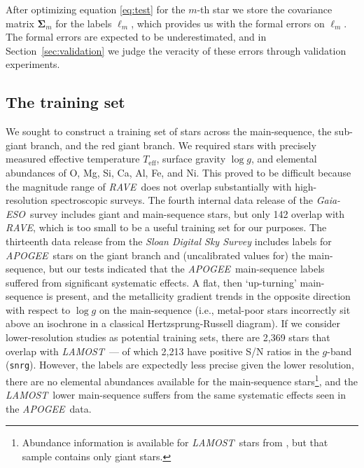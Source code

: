 \documentclass[preprint]{aastex}
\newcommand{\acronym}[1]{{\small{#1}}}
\newcommand{\project}[1]{\textsl{#1}}
\newcommand{\rave}{\project{\acronym{RAVE}}}
\newcommand{\ges}{\project{Gaia-ESO}}
\newcommand{\apogee}{\project{\acronym{APOGEE}}}
\newcommand{\lamost}{\project{\acronym{LAMOST}}}
\newcommand{\teff}{T_{\mathrm{eff}}}
\newcommand{\logg}{\log g}
\begin{document}
After optimizing equation \ref{eq:test} for the $m$-th star we store the covariance matrix 
$\bm{\Sigma}_m$ for the labels $\ell_m$, which provides us with the formal errors on $\ell_m$. 
The formal errors are expected to be underestimated, and in Section~\ref{sec:validation} 
we judge the veracity of these errors through validation experiments.



\subsection{The training set}
\label{sec:the-training-set}


We sought to construct a training set of stars across the main-sequence, the
sub-giant branch, and the red giant branch.  We required stars with precisely measured
effective temperature $\teff$, surface gravity $\logg$, and elemental abundances
of O, Mg, Si, Ca, Al, Fe, and Ni.  This proved to be difficult because the magnitude
range of \rave\ does not overlap substantially with high-resolution spectroscopic
surveys.  The fourth internal data release of the \ges\ survey includes 
giant and main-sequence stars, but only 142 overlap with \rave, which is too small to
be a useful training set for our purposes.  The thirteenth data release from the 
\project{Sloan Digital Sky Survey} \citep{sloan_dr13} includes labels for \apogee\ stars on the
giant branch and (uncalibrated values for) the main-sequence, but our tests indicated
that the \apogee\ main-sequence labels suffered from significant systematic effects.  
A flat, then `up-turning' main-sequence is present, and the metallicity gradient trends in 
the opposite direction with respect to $\logg$ on the main-sequence (i.e., metal-poor
stars incorrectly sit above an isochrone in a classical Hertzsprung-Russell diagram).
If we consider lower-resolution studies as potential training sets, there are 2,369
stars that overlap with \lamost\ --- of which 2,213 have positive S/N ratios in the 
$g$-band (\texttt{snrg}).  However, the labels are expectedly less precise given the
lower resolution, there are no elemental abundances available for the main-sequence 
stars\footnote{Abundance information is available for \lamost\ stars from \citet{Ho_2016},
but that sample contains only giant stars.}, and the \lamost\ lower main-sequence suffers
from the same systematic effects seen in the \apogee\ data. 
\end{document}
